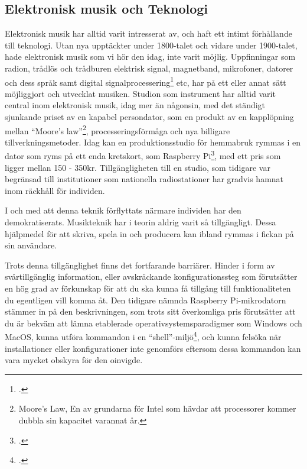 \documentclass{article}
\begin{document}
\subsection{Elektronisk musik och Teknologi}
Elektronisk musik har alltid varit intresserat av, och haft ett intimt förhållande till teknologi. Utan nya
upptäckter under 1800-talet och vidare under 1900-talet, hade elektronisk musik som vi hör den idag, inte
varit möjlig. Uppfinningar som radion, trådlös och trådburen elektrisk signal, magnetband, mikrofoner, datorer
och dess språk samt digital
signalprocessering\footcite{dsp} etc, har på
ett eller annat sätt möjliggjort och utvecklat musiken. Studion som instrument %
har alltid varit central inom elektronisk musik, idag mer än någonsin, med det ständigt sjunkande
priset av en kapabel persondator, som en produkt av en kapplöpning mellan ``Moore's law''\footnote{Moore's
Law, En av grundarna för Intel som hävdar att processorer kommer dubbla sin kapacitet varannat år.},
processeringsförmåga och nya billigare tillverkningsmetoder. Idag kan en produktionsstudio för hemmabruk
rymmas i en dator som ryms på ett enda kretskort, som Raspberry Pi\footcite{rpi}, med ett pris som ligger mellan 150 - 350kr. Tillgängligheten till en studio, som tidigare var begränsad till institutioner som nationella radiostationer har gradvis hamnat inom
räckhåll för individen.

I och med att denna teknik förflyttats närmare individen har den demokratiserats. Musikteknik har i teorin
aldrig varit så tillgängligt. Dessa hjälpmedel för att skriva, spela in och producera kan ibland rymmas i
fickan på sin användare.

Trots denna tillgänglighet finns det fortfarande barriärer. Hinder i form av svårtillgänglig information,
eller avskräckande konfigurationssteg som förutsätter en hög grad av förkunskap för att du ska kunna få
tillgång till funktionaliteten du egentligen vill komma åt. Den tidigare nämnda Raspberry Pi-mikrodatorn
stämmer in på den beskrivningen, som trots sitt överkomliga pris förutsätter att du är bekväm att lämna
etablerade operativsystemsparadigmer som Windows och MacOS, kunna utföra kommandon i en
``shell''-miljö\footcite{unix}, och kunna felsöka när
installationer eller konfigurationer inte genomförs
eftersom dessa kommandon kan vara mycket obskyra för den oinvigde.
	
\end{document}
